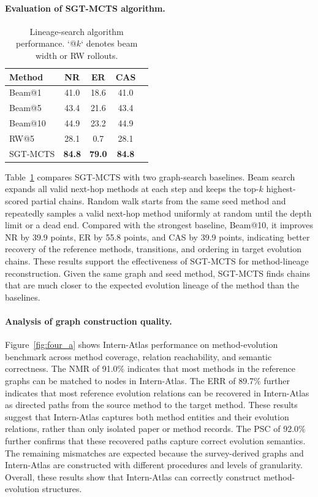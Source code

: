 \documentclass{opendatalab}
\begin{document}

\paragraph{Evaluation of SGT-MCTS algorithm.} 
\begin{table}
\centering
\vspace{-1.5em}
\caption{Lineage-search algorithm performance. `@$k$` denotes beam width or RW rollouts.}
\label{tab:lineage-search-results}
\begin{tabular}{lcccc}
\toprule
\textbf{Method} & \textbf{NR} & \textbf{ER} & \textbf{CAS} \\
\midrule
Beam@1 & 41.0 & 18.6 & 41.0 \\
Beam@5 & 43.4 & 21.6 & 43.4  \\
Beam@10 & 44.9 & 23.2 & 44.9 \\
RW@5 & 28.1 & 0.7 & 28.1 \\
\rowcolor{lightblue} SGT-MCTS & \textbf{84.8} & \textbf{79.0} & \textbf{84.8} \\
\bottomrule
\end{tabular}
\vspace{-1.0em}
\end{table}
Table~\ref{tab:lineage-search-results} compares SGT-MCTS with two graph-search baselines. Beam search expands all valid next-hop methods at each step and keeps the top-$k$ highest-scored partial chains. Random walk starts from the same seed method and repeatedly samples a valid next-hop method uniformly at random until the depth limit or a dead end. Compared with the strongest baseline, Beam@10, it improves NR by 39.9 points, ER by 55.8 points, and CAS by 39.9 points, indicating better recovery of the reference methods, transitions, and ordering in target evolution chains. These results support the effectiveness of SGT-MCTS for method-lineage reconstruction. Given the same graph and seed method, SGT-MCTS finds chains that are much closer to the expected evolution lineage of the method than the baselines.

\paragraph{Analysis of graph construction quality.}
Figure~\ref{fig:four_a} shows Intern-Atlas performance on method-evolution benchmark across method coverage, relation reachability, and semantic correctness. The NMR of 91.0\% indicates that most methods in the reference graphs can be matched to nodes in Intern-Atlas.  The ERR of 89.7\% further indicates that most reference evolution relations can be recovered in Intern-Atlas as directed paths from the source method to the target method. These results suggest that Intern-Atlas captures both method entities and their evolution relations, rather than only isolated paper or method records. The PSC of 92.0\% further confirms that these recovered paths capture correct evolution semantics. The remaining mismatches are expected because the survey-derived graphs and Intern-Atlas are constructed with different procedures and levels of granularity. Overall, these results show that Intern-Atlas can correctly construct method-evolution structures.
\end{document}
